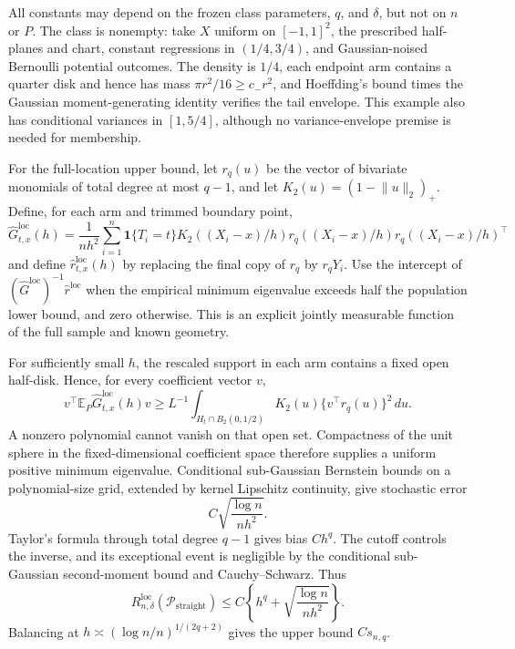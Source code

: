 All constants may depend on the frozen class parameters, \(q\), and \(\delta\), but not on \(n\) or \(P\).  The class is nonempty: take \(X\) uniform on \([-1,1]^2\), the prescribed half-planes and chart, constant regressions in \((1/4,3/4)\), and Gaussian-noised Bernoulli potential outcomes.  The density is \(1/4\), each endpoint arm contains a quarter disk and hence has mass \(\pi r^2/16\geq c_-r^2\), and Hoeffding's bound times the Gaussian moment-generating identity verifies the tail envelope.  This example also has conditional variances in \([1,5/4]\), although no variance-envelope premise is needed for membership.

For the full-location upper bound, let \(r_q(u)\) be the vector of bivariate monomials of total degree at most \(q-1\), and let \(K_2(u)=(1-\lVert u\rVert_2)_+\).  Define, for each arm and trimmed boundary point,
\[
 \widehat G^{\mathrm{loc}}_{t,x}(h)=\frac1{nh^2}\sum_{i=1}^n
 \mathbf1\{T_i=t\}K_2((X_i-x)/h)
 r_q((X_i-x)/h)r_q((X_i-x)/h)^\top
\]
and define \(\widehat r^{\mathrm{loc}}_{t,x}(h)\) by replacing the final copy of \(r_q\) by \(r_qY_i\).  Use the intercept of \((\widehat G^{\mathrm{loc}})^{-1}\widehat r^{\mathrm{loc}}\) when the empirical minimum eigenvalue exceeds half the population lower bound, and zero otherwise.  This is an explicit jointly measurable function of the full sample and known geometry.

For sufficiently small \(h\), the rescaled support in each arm contains a fixed open half-disk.  Hence, for every coefficient vector \(v\),
\[
 v^\top\mathbb E_P\widehat G^{\mathrm{loc}}_{t,x}(h)v
 \geq L^{-1}\int_{H_t\cap B_2(0,1/2)}K_2(u)
 \{v^\top r_q(u)\}^2\,du.
\]
A nonzero polynomial cannot vanish on that open set.  Compactness of the unit sphere in the fixed-dimensional coefficient space therefore supplies a uniform positive minimum eigenvalue.  Conditional sub-Gaussian Bernstein bounds on a polynomial-size grid, extended by kernel Lipschitz continuity, give stochastic error
\[
 C\sqrt{\frac{\log n}{nh^2}}.
\]
Taylor's formula through total degree \(q-1\) gives bias \(Ch^q\).  The cutoff controls the inverse, and its exceptional event is negligible by the conditional sub-Gaussian second-moment bound and Cauchy--Schwarz.  Thus
\[
 R_{n,\delta}^{\mathrm{loc}}(\mathcal P_{\mathrm{straight}})
 \leq C\left\{h^q+\sqrt{\frac{\log n}{nh^2}}\right\}.
\]
Balancing at \(h\asymp(\log n/n)^{1/(2q+2)}\) gives the upper bound \(Cs_{n,q}\).

